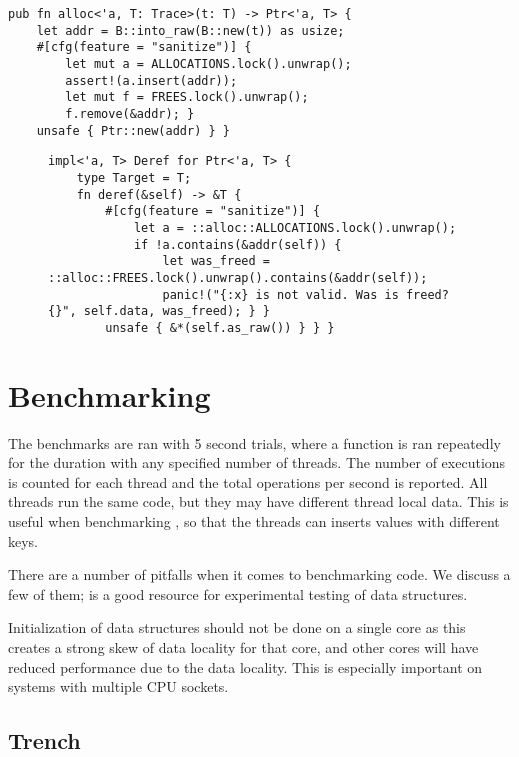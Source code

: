\begin{lstlisting}
pub fn alloc<'a, T: Trace>(t: T) -> Ptr<'a, T> {
    let addr = B::into_raw(B::new(t)) as usize;
    #[cfg(feature = "sanitize")] {
        let mut a = ALLOCATIONS.lock().unwrap();
        assert!(a.insert(addr));
        let mut f = FREES.lock().unwrap();
        f.remove(&addr); }
    unsafe { Ptr::new(addr) } } \end{lstlisting}

\begin{figure}[ht]
\begin{lstlisting}[label=lst:ptr-sanitize,caption=Verifying all pointer accesses with
\code{sanitize}]
impl<'a, T> Deref for Ptr<'a, T> {
    type Target = T;
    fn deref(&self) -> &T {
        #[cfg(feature = "sanitize")] {
            let a = ::alloc::ALLOCATIONS.lock().unwrap();
            if !a.contains(&addr(self)) {
                let was_freed = ::alloc::FREES.lock().unwrap().contains(&addr(self));
                panic!("{:x} is not valid. Was is freed? {}", self.data, was_freed); } }
        unsafe { &*(self.as_raw()) } } }\end{lstlisting}
\end{figure}

\section{Benchmarking}

The benchmarks are ran with 5 second trials, where a function is ran repeatedly for the duration
with any specified number of threads. The number of executions is counted for each thread and
the total operations per second is reported. All threads run the same code, but they may have
different thread local data. This is useful when benchmarking , so that the
threads can inserts values with different keys.

There are a number of pitfalls when it comes to benchmarking code. We discuss a few of them;
\cite{rare} is a good resource for experimental testing of data structures.

Initialization of data structures should not be done on a single core as this creates
a strong skew of data locality for that core, and other cores will have reduced performance due to
the data locality. This is especially important on systems with multiple CPU sockets.




\subsection{Trench}


